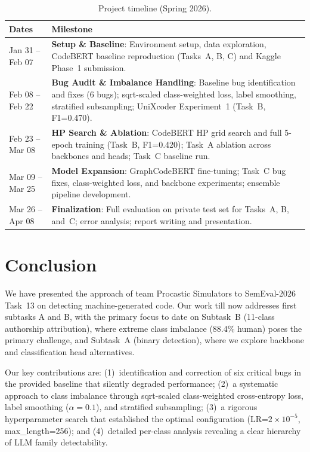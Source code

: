 \documentclass[11pt]{article}
\begin{document}
\begin{table}[ht]
\centering
\small
\begin{tabularx}{\columnwidth}{@{}l X@{}}
\toprule
\textbf{Dates} & \textbf{Milestone} \\ \midrule
Jan 31 -- Feb 07 & \textbf{Setup \& Baseline}: Environment setup, data exploration, CodeBERT baseline reproduction (Tasks~A, B, C) and Kaggle Phase~1 submission. \\ \addlinespace[0.5ex]
Feb 08 -- Feb 22 & \textbf{Bug Audit \& Imbalance Handling}: Baseline bug identification and fixes (6 bugs); sqrt-scaled class-weighted loss, label smoothing, stratified subsampling; UniXcoder Experiment~1 (Task~B, F1=0.470). \\ \addlinespace[0.5ex]
Feb 23 -- Mar 08 & \textbf{HP Search \& Ablation}: CodeBERT HP grid search and full 5-epoch training (Task~B, F1=0.420); Task~A ablation across backbones and heads; Task~C baseline run. \\ \addlinespace[0.5ex]
Mar 09 -- Mar 25 & \textbf{Model Expansion}: GraphCodeBERT fine-tuning; Task~C bug fixes, class-weighted loss, and backbone experiments; ensemble pipeline development. \\ \addlinespace[0.5ex]
Mar 26 -- Apr 08 & \textbf{Finalization}: Full evaluation on private test set for Tasks~A, B, and~C; error analysis; report writing and presentation. \\ \bottomrule
\end{tabularx}
\caption{Project timeline (Spring 2026).}
\label{tab:timeline}
\end{table}

\section{Conclusion}
\label{sec:conclusion}

We have presented the approach of team Procastic Simulators to SemEval-2026 Task~13 on detecting machine-generated code. Our work till now addresses first subtasks A and B, with the primary focus to date on Subtask~B (11-class authorship attribution), where extreme class imbalance (88.4\% human) poses the primary challenge, and Subtask~A (binary detection), where we explore backbone and classification head alternatives.

Our key contributions are: (1)~identification and correction of six critical bugs in the provided baseline that silently degraded performance; (2)~a systematic approach to class imbalance through sqrt-scaled class-weighted cross-entropy loss, label smoothing ($\alpha = 0.1$), and stratified subsampling; (3)~a rigorous hyperparameter search that established the optimal configuration (LR=$2{\times}10^{-5}$, max\_length=256); and (4)~detailed per-class analysis revealing a clear hierarchy of LLM family detectability.
\end{document}
